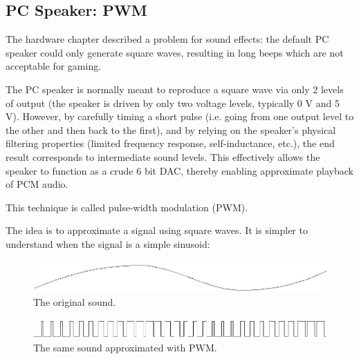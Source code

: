  
\subsection{PC Speaker: PWM}
The hardware chapter described a problem for sound effects: the default PC speaker could only generate square waves, resulting in long beeps which are not acceptable for gaming.\\

\par
 \begin{fancyquotes}
  The PC speaker is normally meant to reproduce a square wave via only 2 levels of output (the speaker is driven by only two voltage levels, typically 0 V and 5 V). However, by carefully timing a short pulse (i.e. going from one output level to the other and then back to the first), and by relying on the speaker's physical filtering properties (limited frequency response, self-inductance, etc.), the end result corresponds to intermediate sound levels. This effectively allows the speaker to function as a crude 6 bit DAC, thereby enabling approximate playback of PCM audio.\\
  \par
  This technique is called pulse-width modulation (PWM).
 \end{fancyquotes}
\par
  
The idea is to approximate a signal using square waves. It is simpler to understand when the signal is a simple sinusoid:
\par
\begin{figure}[H]
\centering
 \includegraphics[width=\textwidth]{imgs/drawings/pwm/sinuois.png}
 \caption{The original sound.}
 \end{figure}
\par

\par
\begin{figure}[H]
\centering
 \includegraphics[width=\textwidth]{imgs/drawings/pwm/pwm_approximation.png}
 \caption{The same sound approximated with PWM.}
 \end{figure}
\par

